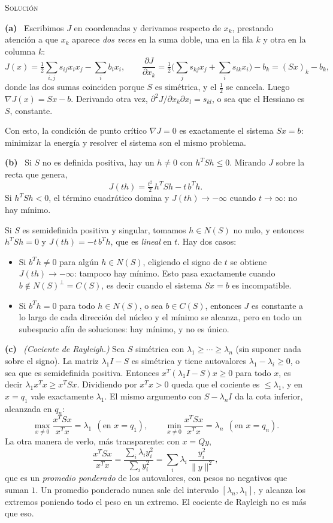 \documentclass[11pt,a4paper]{article}
\newcommand{\solucion}{\par\medskip\noindent\textsc{Solución}\par\nobreak\smallskip\noindent}
\newcommand{\itemsol}[1]{\par\medskip\noindent\textbf{(#1)}\ \ignorespaces}
\begin{document}
\solucion
\itemsol{a} Escribimos $J$ en coordenadas y derivamos respecto de $x_k$,
prestando atención a que $x_k$ aparece \emph{dos veces} en la suma doble, una en
la fila $k$ y otra en la columna $k$:
\[
J(x)=\tfrac12\sum_{i,j}s_{ij}x_ix_j-\sum_i b_ix_i ,
\qquad
\frac{\partial J}{\partial x_k}
=\tfrac12\Big(\sum_j s_{kj}x_j+\sum_i s_{ik}x_i\Big)-b_k=(Sx)_k-b_k ,
\]
donde las dos sumas coinciden porque $S$ es simétrica, y el $\tfrac12$ se
cancela. Luego $\nabla J(x)=Sx-b$. Derivando otra vez,
$\partial^2J/\partial x_k\partial x_l=s_{kl}$, o sea que el Hessiano es $S$,
constante.

Con esto, la condición de punto crítico $\nabla J=0$ es exactamente el sistema
$Sx=b$: minimizar la energía y resolver el sistema son el mismo problema.

\itemsol{b} Si $S$ no es definida positiva, hay un $h\neq0$ con $h^TSh\le0$.
Mirando $J$ sobre la recta que genera,
\[
J(th)=\tfrac{t^{2}}{2}\,h^TSh-t\,b^Th .
\]
Si $h^TSh<0$, el término cuadrático domina y $J(th)\to-\infty$ cuando
$t\to\infty$: no hay mínimo.

Si $S$ es semidefinida positiva y singular, tomamos $h\in N(S)$ no nulo, y
entonces $h^TSh=0$ y $J(th)=-t\,b^Th$, que es \emph{lineal} en $t$. Hay dos
casos:
\begin{itemize}[itemsep=2pt,topsep=3pt]
\item Si $b^Th\neq0$ para algún $h\in N(S)$, eligiendo el signo de $t$ se obtiene
$J(th)\to-\infty$: tampoco hay mínimo. Esto pasa exactamente cuando
$b\notin N(S)^{\perp}=C(S)$, es decir cuando el sistema $Sx=b$ es incompatible.
\item Si $b^Th=0$ para todo $h\in N(S)$, o sea $b\in C(S)$, entonces $J$ es
constante a lo largo de cada dirección del núcleo y el mínimo se alcanza, pero en
todo un subespacio afín de soluciones: hay mínimo, y no es único.
\end{itemize}

\itemsol{c} \emph{(Cociente de Rayleigh.)} Sea $S$ simétrica con
$\lambda_1\ge\cdots\ge\lambda_n$ (sin suponer nada sobre el signo). La matriz
$\lambda_1I-S$ es simétrica y tiene autovalores $\lambda_1-\lambda_i\ge0$, o sea
que es semidefinida positiva. Entonces $x^T(\lambda_1I-S)x\ge0$ para todo $x$, es
decir $\lambda_1x^Tx\ge x^TSx$. Dividiendo por $x^Tx>0$ queda que el cociente es
$\le\lambda_1$, y en $x=q_1$ vale exactamente $\lambda_1$. El mismo argumento con
$S-\lambda_nI$ da la cota inferior, alcanzada en $q_n$:
\[
\max_{x\neq0}\frac{x^TSx}{x^Tx}=\lambda_1\ \ (\text{en }x=q_1),
\qquad
\min_{x\neq0}\frac{x^TSx}{x^Tx}=\lambda_n\ \ (\text{en }x=q_n).
\]
La otra manera de verlo, más transparente: con $x=Qy$,
\[
\frac{x^TSx}{x^Tx}=\frac{\sum_i\lambda_iy_i^{2}}{\sum_iy_i^{2}}
=\sum_i\lambda_i\,\frac{y_i^{2}}{\|y\|^{2}} ,
\]
que es un \emph{promedio ponderado} de los autovalores, con pesos no negativos
que suman $1$. Un promedio ponderado nunca sale del intervalo
$[\lambda_n,\lambda_1]$, y alcanza los extremos poniendo todo el peso en un
extremo. El cociente de Rayleigh no es más que eso.
\end{document}
